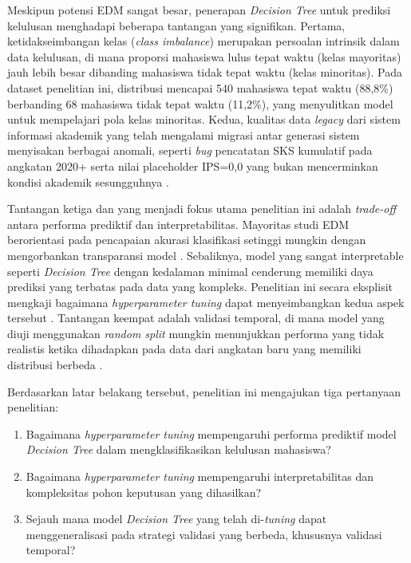 \documentclass{ieeeaccess}
\begin{document}
Meskipun potensi EDM sangat besar, penerapan \emph{Decision Tree} untuk prediksi kelulusan menghadapi beberapa tantangan yang signifikan. Pertama, ketidakseimbangan kelas (\emph{class imbalance}) merupakan persoalan intrinsik dalam data kelulusan, di mana proporsi mahasiswa lulus tepat waktu (kelas mayoritas) jauh lebih besar dibanding mahasiswa tidak tepat waktu (kelas minoritas). Pada dataset penelitian ini, distribusi mencapai 540 mahasiswa tepat waktu (88,8\%) berbanding 68 mahasiswa tidak tepat waktu (11,2\%), yang menyulitkan model untuk mempelajari pola kelas minoritas. Kedua, kualitas data \emph{legacy} dari sistem informasi akademik yang telah mengalami migrasi antar generasi sistem menyisakan berbagai anomali, seperti \emph{bug} pencatatan SKS kumulatif pada angkatan 2020+ serta nilai placeholder IPS=0,0 yang bukan mencerminkan kondisi akademik sesungguhnya \cite{ref26}.

Tantangan ketiga dan yang menjadi fokus utama penelitian ini adalah \emph{trade-off} antara performa prediktif dan interpretabilitas. Mayoritas studi EDM berorientasi pada pencapaian akurasi klasifikasi setinggi mungkin dengan mengorbankan transparansi model \cite{ref10}. Sebaliknya, model yang sangat interpretable seperti \emph{Decision Tree} dengan kedalaman minimal cenderung memiliki daya prediksi yang terbatas pada data yang kompleks. Penelitian ini secara eksplisit mengkaji bagaimana \emph{hyperparameter tuning} dapat menyeimbangkan kedua aspek tersebut \cite{ref21}. Tantangan keempat adalah validasi temporal, di mana model yang diuji menggunakan \emph{random split} mungkin menunjukkan performa yang tidak realistis ketika dihadapkan pada data dari angkatan baru yang memiliki distribusi berbeda \cite{ref6}.

Berdasarkan latar belakang tersebut, penelitian ini mengajukan tiga pertanyaan penelitian:
\begin{enumerate}
    \item[\textbf{RQ1:}] Bagaimana \emph{hyperparameter tuning} mempengaruhi performa prediktif model \emph{Decision Tree} dalam mengklasifikasikan kelulusan mahasiswa?
    \item[\textbf{RQ2:}] Bagaimana \emph{hyperparameter tuning} mempengaruhi interpretabilitas dan kompleksitas pohon keputusan yang dihasilkan?
    \item[\textbf{RQ3:}] Sejauh mana model \emph{Decision Tree} yang telah di-\emph{tuning} dapat menggeneralisasi pada strategi validasi yang berbeda, khususnya validasi temporal?
\end{enumerate}
\end{document}
